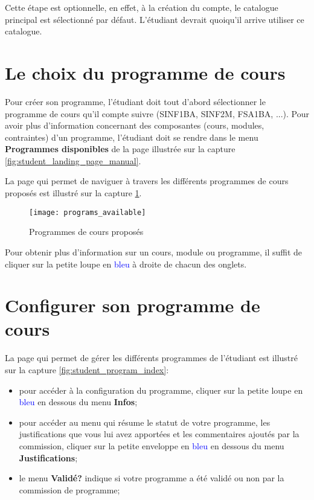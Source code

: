 Cette étape est optionnelle, en effet, à la création du compte, le catalogue principal est sélectionné par défaut. L'étudiant devrait quoiqu'il arrive utiliser ce catalogue.


\section{Le choix du programme de cours}
Pour créer son programme, l'étudiant doit tout d'abord sélectionner le programme de cours qu'il compte suivre (SINF1BA, SINF2M, FSA1BA, ...). Pour avoir plus d'information concernant des composantes (cours, modules, contraintes) d'un programme, l'étudiant doit se rendre dans le menu \textbf{Programmes disponibles} de la page illustrée sur la capture \ref{fig:student_landing_page_manual}. 

La page qui permet de naviguer à travers les différents programmes de cours proposés est illustré sur la capture \ref{fig:programs_availables}.

\begin{figure}[htb]
\centering
\caption{Programmes de cours proposés}
\label{fig:programs_availables}
\texttt{[image: programs\_available]}
\end{figure}

Pour obtenir plus d'information sur un cours, module ou programme, il suffit de cliquer sur la petite loupe en \textcolor{blue}{bleu} à droite de chacun des onglets. 

\section{Configurer son programme de cours}

La page qui permet de gérer les différents programmes de l'étudiant est illustré sur la capture \ref{fig:student_program_index}:

\begin{itemize}
\item pour accéder à la configuration du programme, cliquer sur la petite loupe en \textcolor{blue}{bleu} en dessous du menu \textbf{Infos};
\item pour accéder au menu qui résume le statut de votre programme, les justifications que vous lui avez apportées et les commentaires ajoutés par la commission, cliquer sur la petite enveloppe en \textcolor{blue}{bleu} en dessous du menu \textbf{Justifications};
\item le menu \textbf{Validé?} indique si votre programme a été validé ou non par la commission de programme;
\end{itemize}

